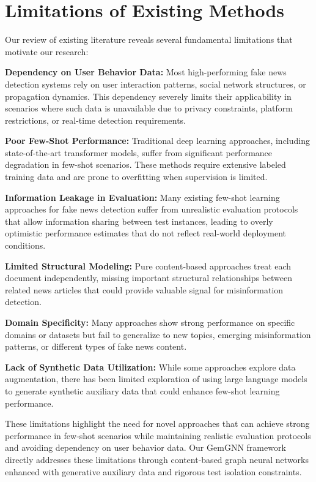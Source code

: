 \section{Limitations of Existing Methods}

Our review of existing literature reveals several fundamental limitations that motivate our research:

\textbf{Dependency on User Behavior Data:} Most high-performing fake news detection systems rely on user interaction patterns, social network structures, or propagation dynamics. This dependency severely limits their applicability in scenarios where such data is unavailable due to privacy constraints, platform restrictions, or real-time detection requirements.

\textbf{Poor Few-Shot Performance:} Traditional deep learning approaches, including state-of-the-art transformer models, suffer from significant performance degradation in few-shot scenarios. These methods require extensive labeled training data and are prone to overfitting when supervision is limited.

\textbf{Information Leakage in Evaluation:} Many existing few-shot learning approaches for fake news detection suffer from unrealistic evaluation protocols that allow information sharing between test instances, leading to overly optimistic performance estimates that do not reflect real-world deployment conditions.

\textbf{Limited Structural Modeling:} Pure content-based approaches treat each document independently, missing important structural relationships between related news articles that could provide valuable signal for misinformation detection.

\textbf{Domain Specificity:} Many approaches show strong performance on specific domains or datasets but fail to generalize to new topics, emerging misinformation patterns, or different types of fake news content.

\textbf{Lack of Synthetic Data Utilization:} While some approaches explore data augmentation, there has been limited exploration of using large language models to generate synthetic auxiliary data that could enhance few-shot learning performance.

These limitations highlight the need for novel approaches that can achieve strong performance in few-shot scenarios while maintaining realistic evaluation protocols and avoiding dependency on user behavior data. Our GemGNN framework directly addresses these limitations through content-based graph neural networks enhanced with generative auxiliary data and rigorous test isolation constraints.

\EndChapter
